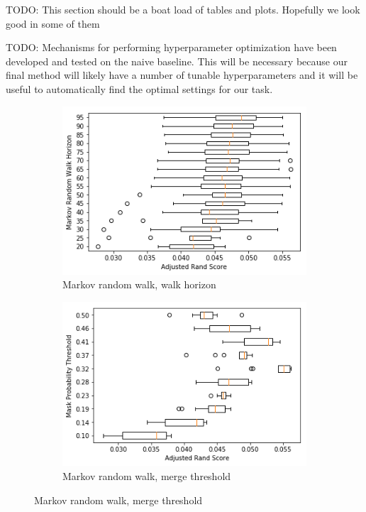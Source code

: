 \documentclass[twocolumn]{article}
\newcommand{\todo}[1]{}
\renewcommand{\todo}[1]{{\color{red} TODO: {#1}}}
\begin{document}
\todo{This section should be a boat load of tables and plots. Hopefully we look good in some of them}

\todo{
Mechanisms for performing hyperparameter optimization have been developed and tested on the naive baseline. This will be
necessary because our final method will likely have a number of tunable hyperparameters and it will be useful to automatically
find the optimal settings for our task.
}

\begin{figure}[t!]
  \centering

  \begin{subfigure}{0.49\linewidth}
    \includegraphics[width=\linewidth]{figs/markov_horizon.png}
    \caption{Markov random walk, walk horizon}
  \end{subfigure}
  \begin{subfigure}{0.49\linewidth}
    \includegraphics[width=\linewidth]{figs/markov_thresh.png}
    \caption{Markov random walk, merge threshold}
  \end{subfigure}


\end{figure}
\end{document}

